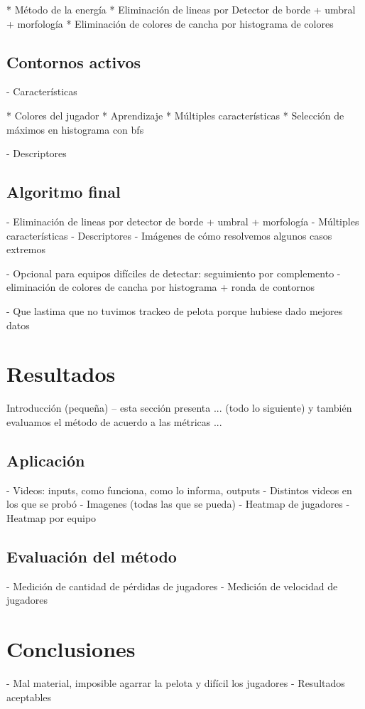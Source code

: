 \documentclass[a4paper,10pt]{article}
\begin{document}
  * Método de la energía
  * Eliminación de lineas por Detector de borde + umbral + morfología
  * Eliminación de colores de cancha por histograma de colores

\subsection{Contornos activos}

- Características

  * Colores del jugador
  * Aprendizaje
  * Múltiples características
  * Selección de máximos en histograma con bfs

- Descriptores

\subsection{Algoritmo final}

- Eliminación de lineas por detector de borde + umbral + morfología
- Múltiples características
- Descriptores
- Imágenes de cómo resolvemos algunos casos extremos

- Opcional para equipos difíciles de detectar: seguimiento por complemento
  - eliminación de colores de cancha por histograma + ronda de contornos

- Que lastima que no tuvimos trackeo de pelota porque hubiese dado mejores datos

\section{Resultados}

Introducción (pequeña) -- esta sección presenta ... (todo lo siguiente) y también evaluamos el método de acuerdo a las métricas ...

\subsection{Aplicación}
  - Videos: inputs, como funciona, como lo informa, outputs
  - Distintos videos en los que se probó
  - Imagenes (todas las que se pueda)
  - Heatmap de jugadores
  - Heatmap por equipo

\subsection{Evaluación del método}
  - Medición de cantidad de pérdidas de jugadores
  - Medición de velocidad de jugadores

\section{Conclusiones}

- Mal material, imposible agarrar la pelota y difícil los jugadores
- Resultados aceptables
\end{document}
